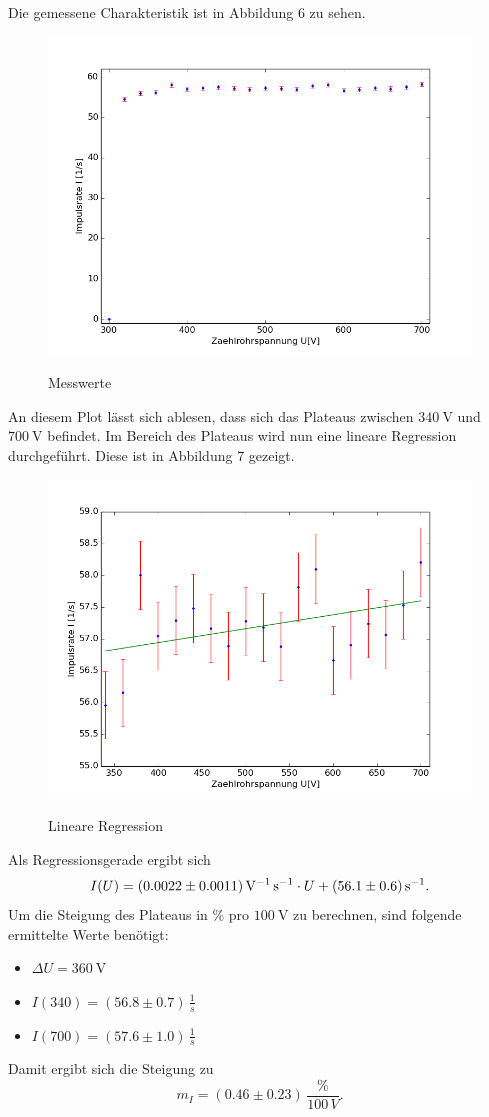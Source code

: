 \documentclass[11pt,ngerman,a4paper]{article}
\begin{document}
\noindent
Die gemessene Charakteristik ist in Abbildung 6 zu sehen.
\begin{figure}[H]
\centering
\includegraphics[scale=0.8]{plot1.png}
\label{plot1}
\caption{Messwerte}
\end{figure}
\noindent
An diesem Plot lässt sich ablesen, dass sich das Plateaus zwischen $\SI{340}{\volt}$ und $\SI{700}{\volt}$ befindet. Im Bereich des Plateaus wird nun eine lineare Regression durchgeführt. Diese ist in Abbildung 7 gezeigt.
\begin{figure}[H]
\centering
\includegraphics[scale=0.8]{plot2.png}
\label{plot2}
\caption{Lineare Regression}
\end{figure}
Als Regressionsgerade ergibt sich
\[
I(U) = \SI{0.0022\pm0.0011}{\per\volt\per\second} \cdot U + \SI{56.1\pm0.6}{\per\second}.
\]
Um die Steigung des Plateaus in \% pro $\SI{100}{\volt}$ zu berechnen, sind folgende ermittelte Werte benötigt:
\begin{itemize}
\item $\Delta U = \SI{360}{\volt}$
\item $I(340) = (56.8\pm0.7) \, \frac{1}{s}$
\item $I(700) = (57.6\pm1.0) \, \frac{1}{s}$
\end{itemize}
Damit ergibt sich die Steigung zu
\[
m_I = (0.46\pm0.23) \, \frac{\%}{100\, V}.
\]
\end{document}
